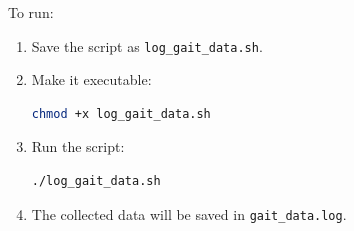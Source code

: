 	To run:
	\begin{enumerate}
		\item Save the script as \texttt{log\_gait\_data.sh}.
		\item Make it executable:
		\begin{lstlisting}[language=bash]
			chmod +x log_gait_data.sh
		\end{lstlisting}
		\item Run the script:
		\begin{lstlisting}[language=bash]
			./log_gait_data.sh
		\end{lstlisting}
		\item The collected data will be saved in \texttt{gait\_data.log}.
	\end{enumerate}
	